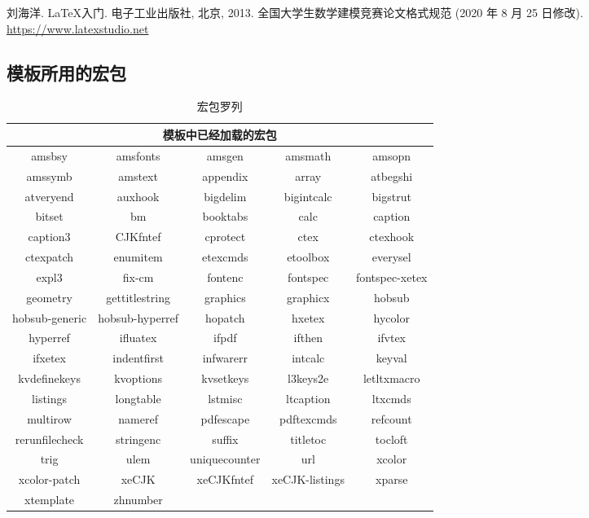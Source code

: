 \documentclass{cumcmthesis}
\begin{document}
 

\begin{thebibliography}{9}%
    刘海洋.
    \newblock \LaTeX {}入门\allowbreak[J].
    \newblock 电子工业出版社, 北京, 2013.
    全国大学生数学建模竞赛论文格式规范 (2020 年 8 月 25 日修改).
     \url{https://www.latexstudio.net}
\end{thebibliography}

\newpage
\begin{appendices}

\section{模板所用的宏包}
\begin{table}[htbp]
    \centering
    \caption{宏包罗列}
    \begin{tabular}{ccccc}
        \toprule
        \multicolumn{5}{c}{模板中已经加载的宏包} \\
        \midrule
        amsbsy & amsfonts & {amsgen} & {amsmath} & {amsopn} \\
        amssymb & amstext & {appendix} & {array} & {atbegshi} \\
        atveryend & auxhook & {bigdelim} & {bigintcalc} & {bigstrut} \\
        bitset & bm    & {booktabs} & {calc} & {caption} \\
        caption3 & CJKfntef & {cprotect} & {ctex} & {ctexhook} \\
        ctexpatch & enumitem & {etexcmds} & {etoolbox} & {everysel} \\
        expl3 & fix-cm & {fontenc} & {fontspec} & {fontspec-xetex} \\
        geometry & gettitlestring & {graphics} & {graphicx} & {hobsub} \\
        hobsub-generic & hobsub-hyperref & {hopatch} & {hxetex} & {hycolor} \\
        hyperref & ifluatex & {ifpdf} & {ifthen} & {ifvtex} \\
        ifxetex & indentfirst & {infwarerr} & {intcalc} & {keyval} \\
        kvdefinekeys & kvoptions & {kvsetkeys} & {l3keys2e} & {letltxmacro} \\
        listings & longtable & {lstmisc} & {ltcaption} & {ltxcmds} \\
        multirow & nameref & {pdfescape} & {pdftexcmds} & {refcount} \\
        rerunfilecheck & stringenc & {suffix} & {titletoc} & {tocloft} \\
        trig  & ulem  & {uniquecounter} & {url} & {xcolor} \\
        xcolor-patch & xeCJK & {xeCJKfntef} & {xeCJK-listings} & {xparse} \\
        xtemplate & zhnumber &       &       &  \\
        \bottomrule
    \end{tabular}%
    \label{tab:addlabel}%
\end{table}%


\end{appendices}
\end{document}
